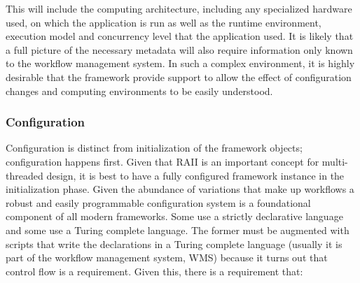 \documentclass[../main-v1.tex]{subfiles}
\begin{document}





This will include the computing architecture, including any specialized hardware used, on which the application is run as well as the runtime environment, execution model and concurrency level that the application used.  It is likely that a full picture of the necessary metadata will also require information only known to the workflow management system.  In such a complex environment, it is highly desirable that the framework provide support to allow the effect of configuration changes and computing environments to be easily understood.



\subsubsection{Configuration} \label{subsec:fworks:config}

Configuration is distinct from initialization of the framework objects; configuration happens first.  Given that RAII is an important concept for multi-threaded design, it is best to have a fully configured framework instance in the initialization phase.  Given the abundance of variations that make up  workflows a robust and easily programmable configuration system is a foundational component of all modern frameworks.  Some use a strictly declarative language and some use a Turing complete language.  The former must be augmented with scripts that write the declarations in a Turing complete language (usually it is part of the workflow management system, WMS) because it turns out that control flow is a requirement.  Given this, there is a requirement that:
\end{document}
